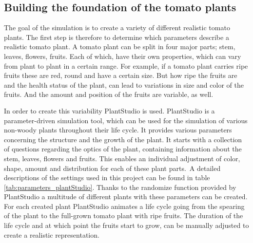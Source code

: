 \graphicspath{{members/cm/figures/}}

\subsection{Building the foundation of the tomato plants}


The goal of the simulation is to create a variety of different realistic tomato plants. The first step is therefore to determine which parameters describe a realistic tomato plant. A tomato plant can be split in four major parts; stem, leaves, flowers, fruits. Each of which, have their own properties, which can vary from plant to plant in a certain range. For example, if a tomato plant carries ripe fruits these are red, round and have a certain size. But how ripe the fruits are and the health status of the plant, can lead to variations in size and color of the fruits. And the amount and position of the fruits are variable, as well. 

In order to create this variability PlantStudio is used.
PlantStudio is a parameter-driven simulation tool, which can be used for the simulation of various non-woody plants throughout their life cycle.
It provides various parameters concerning the structure and the growth of the plant.
It starts with a collection of questions regarding the optics of the plant, containing information about the stem, leaves, flowers and fruits.
This enables an individual adjustment of color, shape, amount and distribution for each of these plant parts. A detailed descriptions of the settings used in this project can be found in table \ref{tab:parameters_plantStudio}. Thanks to the randomize function provided by PlantStudio a multitude of different plants with these parameters can be created.\\

For each created plant PlantStudio animates a life cycle going from the spearing of the plant to the full-grown tomato plant with ripe fruits. The duration of the life cycle and at which point the fruits start to grow, can be manually adjusted to create a realistic representation. \\

